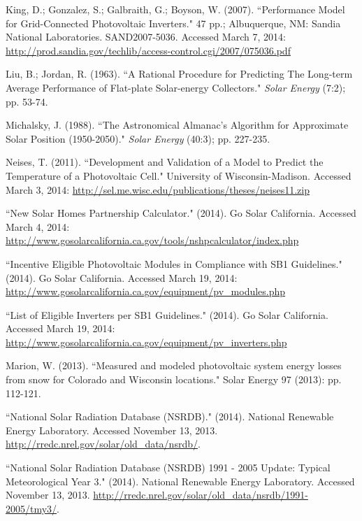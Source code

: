 \documentclass[12pt,letterpaper]{article}
\begin{document}
\begin{thebibliography}{99}
 King, D.; Gonzalez, S.; Galbraith, G.; Boyson, W. (2007). ``Performance Model for Grid-Connected Photovoltaic Inverters." 47 pp.; Albuquerque, NM: Sandia National Laboratories. SAND2007-5036. Accessed March 7, 2014: \url{http://prod.sandia.gov/techlib/access-control.cgi/2007/075036.pdf}

 Liu, B.; Jordan, R. (1963). ``A Rational Procedure for Predicting The Long-term Average Performance of Flat-plate Solar-energy Collectors." \textit{Solar Energy} (7:2); pp. 53-74.

 Michalsky, J. (1988). ``The Astronomical Almanac's Algorithm for Approximate Solar Position (1950-2050)." \textit{Solar Energy} (40:3); pp. 227-235.

 Neises, T. (2011). ``Development and Validation of a Model to Predict the Temperature of a Photovoltaic Cell." University of Wisconsin-Madison. Accessed March 3, 2014: \url{http://sel.me.wisc.edu/publications/theses/neises11.zip}

 ``New Solar Homes Partnership Calculator." (2014). Go Solar California. Accessed March 4, 2014: \url{http://www.gosolarcalifornia.ca.gov/tools/nshpcalculator/index.php}

 ``Incentive Eligible Photovoltaic Modules in Compliance with SB1 Guidelines." (2014). Go Solar California. Accessed March 19, 2014:
 \url{http://www.gosolarcalifornia.ca.gov/equipment/pv_modules.php}

 ``List of Eligible Inverters per SB1 Guidelines." (2014). Go Solar California. Accessed March 19, 2014:
 \url{http://www.gosolarcalifornia.ca.gov/equipment/pv_inverters.php}

 Marion, W. (2013). ``Measured and modeled photovoltaic system energy losses from snow for Colorado and Wisconsin locations." Solar Energy 97 (2013): pp. 112-121.

 ``National Solar Radiation Database (NSRDB)." (2014). National Renewable Energy Laboratory.  Accessed November 13, 2013. \url{http://rredc.nrel.gov/solar/old_data/nsrdb/}.

 ``National Solar Radiation Database (NSRDB) 1991 - 2005 Update: Typical Meteorological Year 3." (2014). National Renewable Energy Laboratory. Accessed November 13, 2013. \url{http://rredc.nrel.gov/solar/old\_data/nsrdb/1991-2005/tmy3/}.


\end{thebibliography}
\end{document}

